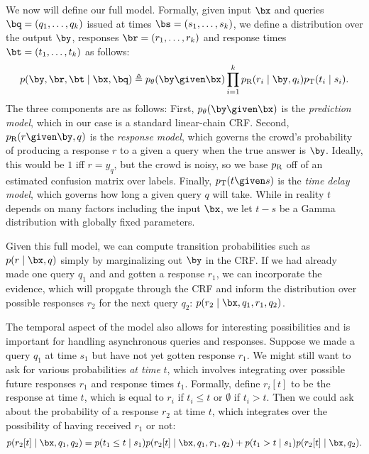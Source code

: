 We now will define our full model.
Formally, given input $\bx$ and queries $\bq = (q_1, \dots, q_k)$ issued at times $\bs = (s_1, \dots, s_k)$,
we define a distribution over the output $\by$, responses $\br = (r_1, \dots, r_k)$
and response times $\bt = (t_1, \dots, t_k)$ as follows:
\begin{align}
p(\by, \br, \bt \mid \bx, \bq) \eqdef \p(\by \given \bx) \prod_{i=1}^k \presp(r_i \mid \by, q_i) \ptime(t_i \mid s_i).
\end{align}
The three components are as follows:
First, $\p(\by \given \bx)$ is the \emph{prediction model},
which in our case is a standard linear-chain CRF.
Second, $\presp(r \given \by, q)$ is the \emph{response model},
which governs the crowd's probability of producing a response $r$ to a given a query when the true answer is $\by$.
Ideally, this would be $1$ iff $r = y_q$, but the crowd is noisy,
so we base $p_{\text{R}}$ off of an estimated confusion matrix over labels.
Finally, $\ptime(t \given s)$ is the \emph{time delay model},
which governs how long a given query $q$ will take.
While in reality $t$ depends on many factors including the input $\bx$,
we let $t - s$ be a Gamma distribution with globally fixed parameters.

Given this full model, we can compute transition probabilities such as $p(r \mid \bx, q)$
simply by marginalizing out $\by$ in the CRF.
If we had already made one query $q_1$ and and gotten a response $r_1$,
we can incorporate the evidence, which will propgate through the CRF
and inform the distribution over possible responses $r_2$ for the next query $q_2$:
$p(r_2 \mid \bx, q_1, r_1, q_2)$.

The temporal aspect of the model also allows for interesting possibilities
and is important for handling asynchronous queries and responses.
Suppose we made a query $q_1$ at time $s_1$ but have not yet gotten response $r_1$.
We might still want to ask for various probabilities \emph{at time} $t$,
which involves integrating over possible future responses $r_1$ and response times $t_1$.
Formally, define $r_i[t]$ to be the response at time $t$, which is equal to $r_i$ if $t_i \le t$
or $\emptyset$ if $t_i > t$.
Then we could ask about the probability of a response $r_2$ at time $t$,
which integrates over the possibility of having received $r_1$ or not:
\begin{align}
p(r_2[t] \mid \bx, q_1, q_2) = p(t_1 \le t \mid s_1) p(r_2[t] \mid \bx, q_1, r_1, q_2) + p(t_1 > t \mid s_1) p(r_2[t] \mid \bx, q_2).
\end{align}

